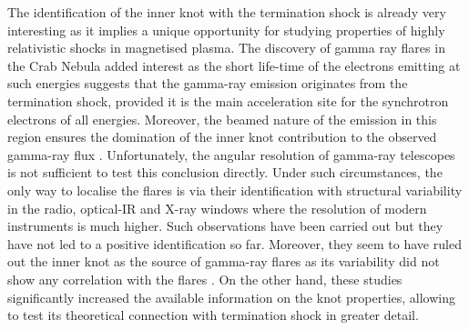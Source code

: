 The identification of the inner knot with the termination shock is already very interesting as it implies a unique opportunity for studying properties of highly relativistic shocks in magnetised plasma.  The discovery of gamma ray flares in the Crab Nebula added interest as the short life-time of the electrons emitting at such energies suggests that the gamma-ray emission originates from the termination shock, provided it is the main acceleration site for the synchrotron electrons of all energies. Moreover, the beamed nature of the emission in this region ensures the domination of  the inner knot contribution to the observed 
gamma-ray flux \citep{ssk-lyut-11}.  Unfortunately, the angular resolution of gamma-ray telescopes is not sufficient to test this conclusion directly.  Under such circumstances, the only way to localise the flares is via their identification with structural variability in the radio, optical-IR and X-ray windows where the resolution of modern instruments is much higher. Such observations have been carried out but they have not led to a positive identification so far. Moreover, they seem to have ruled out the inner knot as the source of gamma-ray flares as its variability did not show any correlation with the flares \citep{Rudy-15}. On the other hand, these studies significantly  increased the available information on the knot properties, allowing to test its theoretical connection with termination shock in greater detail.   